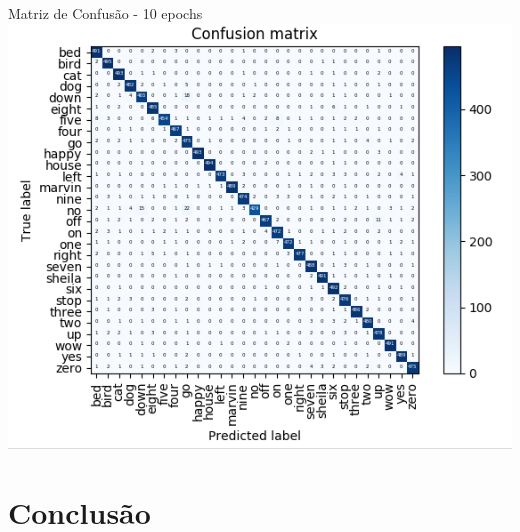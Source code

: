 \documentclass[10pt, compress]{beamer}
\begin{document}
\begin{frame}{Matriz de Confusão - 10 epochs}
\includegraphics[scale=0.5]{images/mtxc.png}
\end{frame}



\section{Conclusão}

\end{document}
